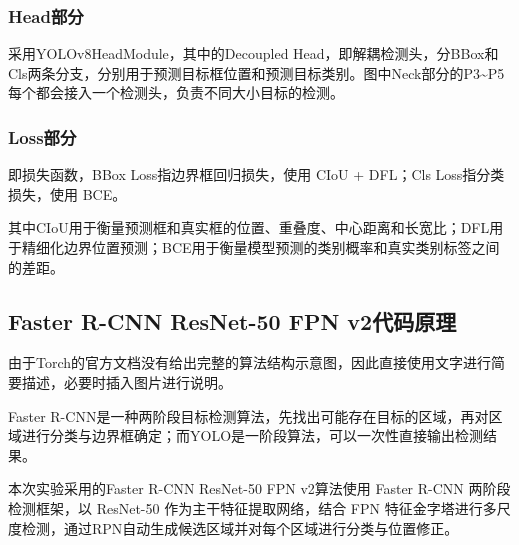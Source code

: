 \documentclass[12pt, oneside, a4paper]{ctexart}
\begin{document}
\subsubsection{Head部分}
\par{}
采用YOLOv8HeadModule，其中的Decoupled Head，即解耦检测头，分BBox和Cls两条分支，分别用于预测目标框位置和预测目标类别。图中Neck部分的P3\textasciitilde P5每个都会接入一个检测头，负责不同大小目标的检测。
\subsubsection{Loss部分}
\par{}
即损失函数，BBox Loss指边界框回归损失，使用 CIoU + DFL；Cls Loss指分类损失，使用 BCE。
\par{}
其中CIoU用于衡量预测框和真实框的位置、重叠度、中心距离和长宽比；DFL用于精细化边界位置预测；BCE用于衡量模型预测的类别概率和真实类别标签之间的差距。
\vspace{0.25cm}
\subsection{Faster R-CNN ResNet-50 FPN v2代码原理}
\par{}
由于Torch的官方文档没有给出完整的算法结构示意图，因此直接使用文字进行简要描述，必要时插入图片进行说明。
\par{}
Faster R-CNN是一种两阶段目标检测算法，先找出可能存在目标的区域，再对区域进行分类与边界框确定；而YOLO是一阶段算法，可以一次性直接输出检测结果。
\par{}
本次实验采用的Faster R-CNN ResNet-50 FPN v2算法使用 Faster R-CNN 两阶段检测框架，以 ResNet-50 作为主干特征提取网络，结合 FPN 特征金字塔进行多尺度检测，通过RPN自动生成候选区域并对每个区域进行分类与位置修正。
\end{document}
